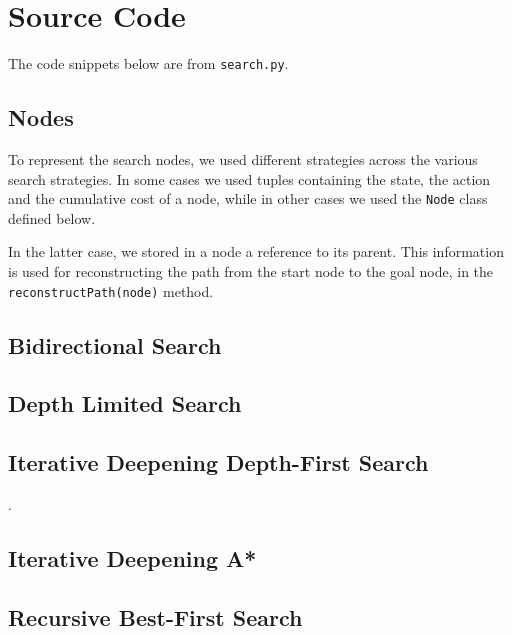 \chapter{Source Code} 

The code snippets below are from \verb|search.py|.



\section{Nodes}
\label{sec:nodes}

To represent the search nodes, we used different strategies across the various search strategies. In some cases we used tuples containing the state, the action and the cumulative cost of a node, while in other cases we used the \verb|Node| class defined below.

In the latter case, we stored in a node a reference to its parent. This information is used for reconstructing the path from the start node to the goal node, in the \verb|reconstructPath(node)| method.




  
  
  
\section{Bidirectional Search}





\section{Depth Limited Search}
\label{sec:code_dls}





\section{Iterative Deepening Depth-First Search}
\label{sec:code_iddfs}.





\section{Iterative Deepening A*}





\section{Recursive Best-First Search}
\label{sec:code_rbfs}



